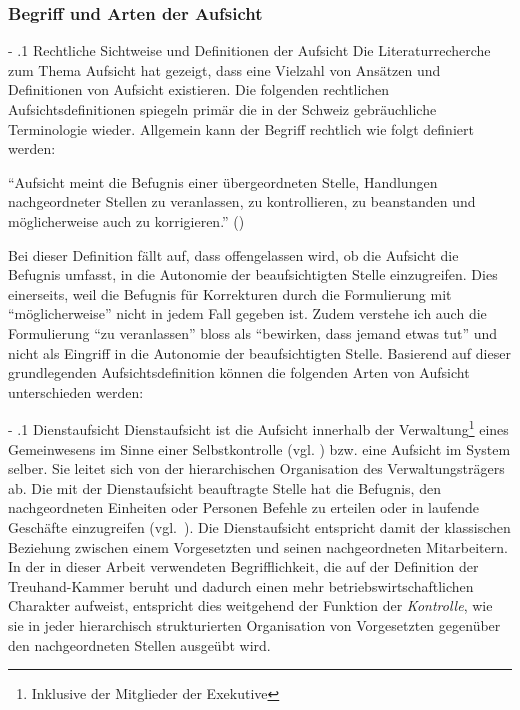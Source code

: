 \documentclass[10pt]{article}
\makeatletter
\renewcommand\paragraph{\@startsection{paragraph}{3}{0mm}{-\baselineskip}{.1\baselineskip}{\normalfont\normalsize\bfseries}}
\renewcommand\subparagraph{\@startsection{subparagraph}{4}{0mm}{-\baselineskip}{.1\baselineskip}{\normalfont\normalsize\bfseries}}
\renewcommand\paragraph{%
\@startsection{paragraph}{3}{0mm}%
{-\baselineskip}%
{.1\baselineskip}%
{\normalfont\normalsize\bfseries}}
\renewcommand\subparagraph{%
\@startsection{subparagraph}{4}{0mm}%
{-\baselineskip}%
{.1\baselineskip}%
{\normalfont\normalsize\bfseries}}
\makeatother
\begin{document}
\subsubsection{Begriff und Arten der Aufsicht}\label{subsubsec:begriff_und_arten_der_aufsicht}
\paragraph{Rechtliche Sichtweise und Definitionen der Aufsicht}\label{para:rechtliche_sichtweise_und_definitionen_der_aufsicht}
Die Literaturrecherche zum Thema Aufsicht hat gezeigt, dass eine Vielzahl von Ansätzen und Definitionen von Aufsicht existieren. Die folgenden rechtlichen Aufsichtsdefinitionen spiegeln primär die in der Schweiz gebräuchliche Terminologie wieder. Allgemein kann der Begriff rechtlich wie folgt definiert werden: 

“{}Aufsicht meint die Befugnis einer übergeordneten Stelle, Handlungen nachgeordneter Stellen zu veranlassen, zu kontrollieren, zu beanstanden und möglicherweise auch zu korrigieren.”{} (\cite[41]{Tschannen2014})

Bei dieser Definition fällt auf, dass offengelassen wird, ob die Aufsicht die Befugnis umfasst, in die Autonomie der beaufsichtigten Stelle einzugreifen. Dies einerseits, weil die Befugnis für Korrekturen durch die Formulierung mit “{}möglicherweise”{} nicht in jedem Fall gegeben ist. Zudem verstehe ich auch die Formulierung “{}zu veranlassen”{} bloss als “{}bewirken, dass jemand etwas tut”{} und nicht als Eingriff in die Autonomie der beaufsichtigten Stelle. Basierend auf dieser grundlegenden Aufsichtsdefinition können die folgenden Arten von Aufsicht unterschieden werden:

\subparagraph{Dienstaufsicht}\label{subpara:dienstaufsicht}
Dienstaufsicht ist die Aufsicht innerhalb der Verwaltung\footnote{Inklusive der Mitglieder der Exekutive} eines Gemein­wesens im Sinne einer Selbst­kontrolle (vgl. \cite[237]{Friederich2013}) bzw. eine Aufsicht im System selber. Sie leitet sich von der hierarchischen Organisation des Verwaltungsträgers ab. Die mit der Dienstaufsicht beauftragte Stelle hat die Befugnis, den nachgeordneten Einheiten oder Personen Befehle zu erteilen oder in laufende Geschäfte einzugreifen (vgl.~\cite[41]{Tschannen2014}). Die Dienstaufsicht entspricht damit der klassischen Beziehung zwischen einem Vorgesetzten und seinen nachgeordneten Mitarbeitern. In der in dieser Arbeit verwendeten Begrifflichkeit, die auf der Definition der Treuhand-Kammer beruht und dadurch einen mehr betriebswirtschaftlichen Charakter aufweist, entspricht dies weitgehend der Funktion der \textit{Kontrolle}, wie sie in jeder hierarchisch strukturierten Organisation von Vorgesetzten gegenüber den nachgeordneten Stellen ausgeübt wird.
\end{document}
